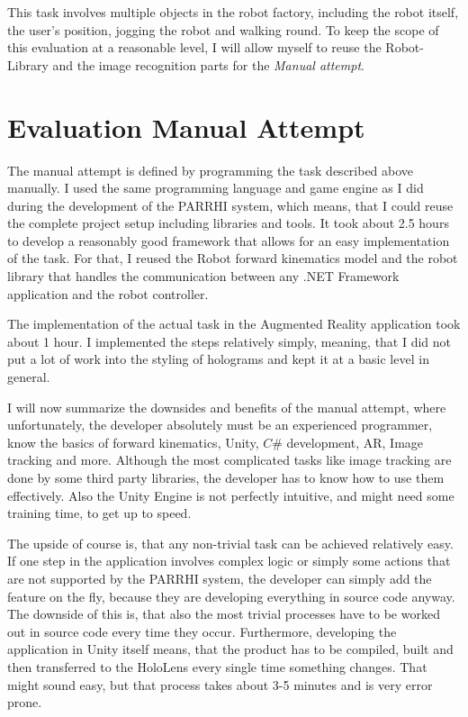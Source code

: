 This task involves multiple objects in the robot factory, including the robot itself, the user's position, jogging the robot and walking round. To keep the scope of this evaluation at a reasonable level, I will allow myself to reuse the Robot-Library and the image recognition parts for the \textit{Manual attempt}. 

\section{Evaluation Manual Attempt}

The manual attempt is defined by programming the task described above manually. I used the same programming language and game engine as I did during the development of the PARRHI system, which means, that I could reuse the complete project setup including libraries and tools. It took about 2.5 hours to develop a reasonably good framework that allows for an easy implementation of the task. For that, I reused the Robot forward kinematics model and the robot library that handles the communication between any .NET Framework application and the robot controller. 

The implementation of the actual task in the Augmented Reality application took about 1 hour. I implemented the steps relatively simply, meaning, that I did not put a lot of work into the styling of holograms and kept it at a basic level in general.

I will now summarize the downsides and benefits of the manual attempt, where unfortunately, the developer absolutely must be an experienced programmer, know the basics of forward kinematics, Unity, $C\#$ development, AR, Image tracking and more. Although the most complicated tasks like image tracking are done by some third party libraries, the developer has to know how to use them effectively. Also the Unity Engine is not perfectly intuitive, and might need some training time, to get up to speed.

The upside of course is, that any non-trivial task can be achieved relatively easy. If one step in the application involves complex logic or simply some actions that are not supported by the PARRHI system, the developer can simply add the feature on the fly, because they are developing everything in source code anyway. The downside of this is, that also the most trivial processes have to be worked out in source code every time they occur. Furthermore, developing the application in Unity itself means, that the product has to be compiled, built and then transferred to the HoloLens every single time something changes. That might sound easy, but that process takes about 3-5 minutes and is very error prone.

